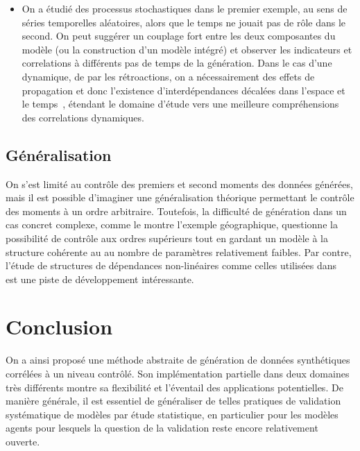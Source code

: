 \begin{itemize}
\item On a étudié des processus stochastiques dans le premier exemple, au sens de séries temporelles aléatoires, alors que le temps ne jouait pas de rôle dans le second. On peut suggérer un couplage fort entre les deux composantes du modèle (ou la construction d'un modèle intégré) et observer les indicateurs et correlations à différents pas de temps de la génération. Dans le cas d'une dynamique, de par les rétroactions, on a nécessairement des effets de propagation et donc l'existence d'interdépendances décalées dans l'espace et le temps~\cite{pigozzi1980interurban}, étendant le domaine d'étude vers une meilleure compréhensions des correlations dynamiques.
\end{itemize}



\subsection*{Généralisation}

On s'est limité au contrôle des premiers et second moments des données générées, mais il est possible d'imaginer une généralisation théorique permettant le contrôle des moments à un ordre arbitraire. Toutefois, la difficulté de génération dans un cas concret complexe, comme le montre l'exemple géographique, questionne la possibilité de contrôle aux ordres supérieurs tout en gardant un modèle à la structure cohérente au au nombre de paramètres relativement faibles. Par contre, l'étude de structures de dépendances non-linéaires comme celles utilisées dans~\cite{chicheportiche2013nested} est une piste de développement intéressante.




\section{Conclusion}


On a ainsi proposé une méthode abstraite de génération de données synthétiques corrélées à un niveau contrôlé. Son implémentation partielle dans deux domaines très différents montre sa flexibilité et l'éventail des applications potentielles. De manière générale, il est essentiel de généraliser de telles pratiques de validation systématique de modèles par étude statistique, en particulier pour les modèles agents pour lesquels la question de la validation reste encore relativement ouverte.




